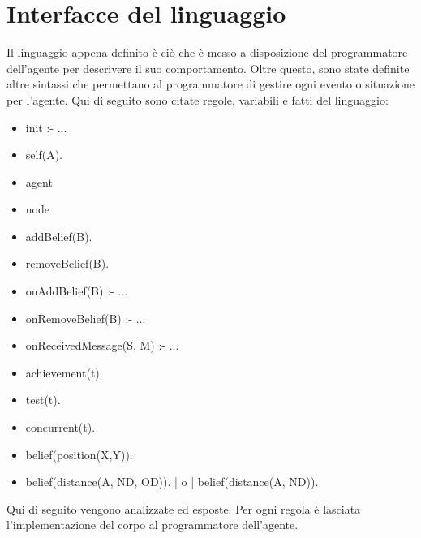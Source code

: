 

\section{Interfacce del linguaggio}
Il linguaggio appena definito \`e ci\`o che \`e messo a disposizione del programmatore dell'agente per descrivere il suo comportamento. Oltre questo, sono state definite altre sintassi che permettano al programmatore di gestire ogni evento o situazione per l'agente. 
Qui di seguito sono citate regole, variabili e fatti del linguaggio:
\begin{itemize}
\item init :- ...
\item self(A).
\item agent
\item node
\item addBelief(B).
\item removeBelief(B).
\item onAddBelief(B) :- ...
\item onRemoveBelief(B) :- ...
\item onReceivedMessage(S, M) :- ...
\item achievement(t).
\item test(t).
\item concurrent(t).
\item belief(position(X,Y)).
\item belief(distance(A, ND, OD)). | o |  belief(distance(A, ND)).
\end{itemize}

Qui di seguito vengono analizzate ed esposte. Per ogni regola \`e lasciata l'implementazione del corpo al programmatore dell'agente.

